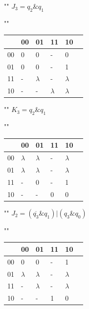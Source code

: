 \begin{center}
    \pagebreak

	""\newline
	$J_{3} = q_{2} \& q_{1}$
	
	""\newline
	\begin{tabular}{ | l | l | l | l | l | p{1cm} |}
		\hline
		\diagbox[width=5em]{$q_{3}q_{2}$}{$q_{1}q_{0}$} & 00 & 01 & 11 & 10 \\\hline
		00 & 0 & 0 & - & 0 \\\hline
		01 & 0 & 0 & \cellcolor{blue!25} - & \cellcolor{blue!25} 1 \\ \hline
		11 & - & $\lambda$ & \cellcolor{blue!25} - &  \cellcolor{blue!25} $\lambda$ \\ \hline
		10 & - & - & $\lambda$ & $\lambda$ \\ 
		\hline
	\end{tabular}

	""\newline\newline
	$K_{3} = q_{2} \& q_{1}$
	
	""\newline
	\begin{tabular}{ | l | l | l | l | l | p{1cm} |}
		\hline
		\diagbox[width=5em]{$q_{3}q_{2}$}{$q_{1}q_{0}$} & 00 & 01 & 11 & 10 \\\hline
		00 & $\lambda$ & $\lambda$ & - & $\lambda$ \\\hline
		01 & $\lambda$ & $\lambda$ & \cellcolor{blue!25} - & \cellcolor{blue!25} $\lambda$ \\ \hline
		11 & - & 0 & \cellcolor{blue!25} - &  \cellcolor{blue!25} 1  \\ \hline
		10 & - & - & 0 & 0 \\ 
		\hline
	\end{tabular}

	""\newline\newline
	$J_{2} = (\overline{q_{3}} \& q_{1})| (q_{3} \& q_{0})$
	
	""\newline
	\begin{tabular}{ | l | l | l | l | l | p{1cm} |}
		\hline
		\diagbox[width=5em]{$q_{3}q_{2}$}{$q_{1}q_{0}$} & 00 & 01 & 11 & 10 \\\hline
		00 & 0 & 0 & \cellcolor{blue!25} - & \cellcolor{blue!25} 1 \\\hline
		01 & $\lambda$ & $\lambda$ & \cellcolor{blue!25} - & \cellcolor{blue!25} $\lambda$ \\ \hline
		11 & - & \cellcolor{blue!25} $\lambda$ & \cellcolor{blue!25} - &  $\lambda$  \\ \hline
		10 & - & \cellcolor{blue!25} - & \cellcolor{blue!25} 1 & 0 \\ 
		\hline
	\end{tabular}


\end{center}
